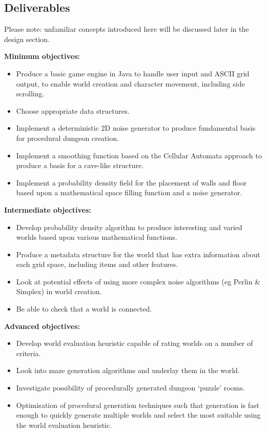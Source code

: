 \documentclass[12pt,a4paper]{article}
\begin{document}

\subsection{Deliverables}


Please note: unfamiliar concepts introduced here will be discussed later in the design section.

\textbf{Minimum objectives:}

\begin{itemize}%

	\item Produce a basic game engine in Java to handle user input and ASCII grid output, to enable world creation and character movement, including side scrolling.
	\item Choose appropriate data structures.
	\item Implement a deterministic 2D noise generator to produce fundamental basis for procedural dungeon creation.
	\item Implement a smoothing function based on the Cellular Automata approach to produce a basis for a cave-like structure.
	\item Implement a probability density field for the placement of walls and floor based upon a mathematical space filling function and a noise generator. 
\end{itemize}
\textbf{Intermediate objectives:}
\begin{itemize}
	\item Develop probability density algorithm to produce interesting and varied worlds based upon various mathematical functions.
	\item Produce a metadata structure for the world that has extra information about each grid space, including items and other features.
	\item Look at potential effects of using more complex noise algorithms (eg Perlin \& Simplex) in world creation.
	\item Be able to check that a world is connected.
\end{itemize}
\textbf{Advanced objectives:}
\begin{itemize}
	
	\item Develop world evaluation heuristic capable of rating worlds on a number of criteria.
	\item Look into maze generation algorithms and underlay them in the world.
	\item Investigate possibility of procedurally generated dungeon `puzzle' rooms.
	\item Optimisation of procedural generation techniques such that generation is fast enough to quickly generate multiple worlds and select the most suitable using the world evaluation heuristic. 
\end{itemize}
\end{document}
